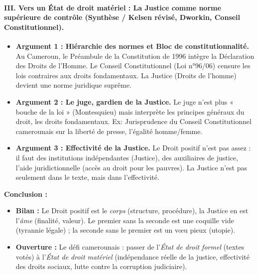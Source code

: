 \documentclass[11pt]{article}
\newcommand{\cle}[1]{{\popxbold\color{popdark}#1}}
\begin{document}
\begin{exoresolu}
    \paragraph{III. Vers un État de droit matériel : La Justice comme norme supérieure de contrôle (Synthèse / Kelsen révisé, Dworkin, Conseil Constitutionnel).}
    \begin{itemize}
        \item \textbf{Argument 1 : Hiérarchie des normes et Bloc de constitutionnalité.} Au Cameroun, le Préambule de la Constitution de 1996 intègre la Déclaration des Droits de l'Homme. Le Conseil Constitutionnel (Loi n°96/06) censure les lois contraires aux droits fondamentaux. La Justice (Droits de l'homme) devient une \cle{norme juridique suprême}.
        \item \textbf{Argument 2 : Le juge, gardien de la Justice.} Le juge n'est plus « bouche de la loi » (Montesquieu) mais interprète les principes généraux du droit, les droits fondamentaux. Ex: Jurisprudence du Conseil Constitutionnel camerounais sur la liberté de presse, l'égalité homme/femme.
        \item \textbf{Argument 3 : Effectivité de la Justice.} Le Droit positif n'est pas assez : il faut des institutions indépendantes (Justice), des auxiliaires de justice, l'aide juridictionnelle (accès au droit pour les pauvres). La Justice n'est pas seulement dans le texte, mais dans l'\cle{effectivité}.
    \end{itemize}
    \textbf{Conclusion :}
    \begin{itemize}
        \item \textbf{Bilan :} Le Droit positif est le \emph{corps} (structure, procédure), la Justice en est l'\emph{âme} (finalité, valeur). Le premier sans la seconde est une coquille vide (tyrannie légale) ; la seconde sans le premier est un vœu pieux (utopie).
        \item \textbf{Ouverture :} Le défi camerounais : passer de l'\emph{État de droit formel} (textes votés) à l'\emph{État de droit matériel} (indépendance réelle de la justice, effectivité des droits sociaux, lutte contre la corruption judiciaire).
    \end{itemize}
\end{exoresolu}
\end{document}
